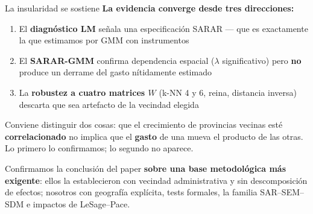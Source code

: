 \documentclass[
  10pt,
  ignorenonframetext,
  aspectratio=169,
  spanish,
]{beamer}
\providecommand{\tightlist}{%
  \setlength{\itemsep}{0pt}\setlength{\parskip}{0pt}}
\begin{document}
\begin{frame}{La insularidad se sostiene}
\protect{}\label{la-insularidad-se-sostiene}
\textbf{La evidencia converge desde tres direcciones:}

\vspace{0.2cm}

\begin{enumerate}
\tightlist
\item
  El \textbf{diagnóstico LM} señala una especificación SARAR --- que es
  exactamente la que estimamos por GMM con instrumentos
\item
  El \textbf{SARAR-GMM} confirma dependencia espacial (\(\lambda\)
  significativo) pero \textbf{no} produce un derrame del gasto
  nítidamente estimado
\item
  La \textbf{robustez a cuatro matrices \(W\)} (k-NN 4 y 6, reina,
  distancia inversa) descarta que sea artefacto de la vecindad elegida
\end{enumerate}

\vspace{0.3cm}

\small

Conviene distinguir dos cosas: que el crecimiento de provincias vecinas
esté \textbf{correlacionado} no implica que el \textbf{gasto} de una
mueva el producto de las otras. Lo primero lo confirmamos; lo segundo no
aparece. \normalsize

\vspace{0.4cm}

Confirmamos la conclusión del paper \textbf{sobre una base metodológica
más exigente}: ellos la establecieron con vecindad administrativa y sin
descomposición de efectos; nosotros con geografía explícita, tests
formales, la familia SAR--SEM--SDM e impactos de LeSage--Pace.
\end{frame}
\end{document}

